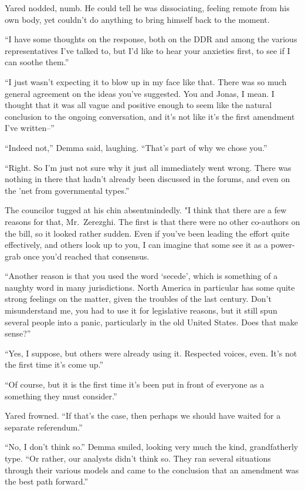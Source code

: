 Yared nodded, numb. He could tell he was dissociating, feeling remote from his own body, yet couldn't do anything to bring himself back to the moment.

``I have some thoughts on the response, both on the DDR and among the various representatives I've talked to, but I'd like to hear your anxieties first, to see if I can soothe them.''

``I just wasn't expecting it to blow up in my face like that. There was so much general agreement on the ideas you've suggested. You and Jonas, I mean. I thought that it was all vague and positive enough to seem like the natural conclusion to the ongoing conversation, and it's not like it's the first amendment I've written--''

``Indeed not,'' Demma said, laughing. ``That's part of why we chose you.''

``Right. So I'm just not sure why it just all immediately went wrong. There was nothing in there that hadn't already been discussed in the forums, and even on the 'net from governmental types.''

The councilor tugged at his chin absentmindedly. "I think that there are a few reasons for that, Mr.~Zerezghi. The first is that there were no other co-authors on the bill, so it looked rather sudden. Even if you've been leading the effort quite effectively, and others look up to you, I can imagine that some see it as a power-grab once you'd reached that consensus.

``Another reason is that you used the word `secede', which is something of a naughty word in many jurisdictions. North America in particular has some quite strong feelings on the matter, given the troubles of the last century. Don't misunderstand me, you had to use it for legislative reasons, but it still spun several people into a panic, particularly in the old United States. Does that make sense?''

``Yes, I suppose, but others were already using it. Respected voices, even. It's not the first time it's come up.''

``Of course, but it is the first time it's been put in front of everyone as a something they must consider.''

Yared frowned. ``If that's the case, then perhaps we should have waited for a separate referendum.''

``No, I don't think so.'' Demma smiled, looking very much the kind, grandfatherly type. ``Or rather, our analysts didn't think so. They ran several situations through their various models and came to the conclusion that an amendment was the best path forward.''

